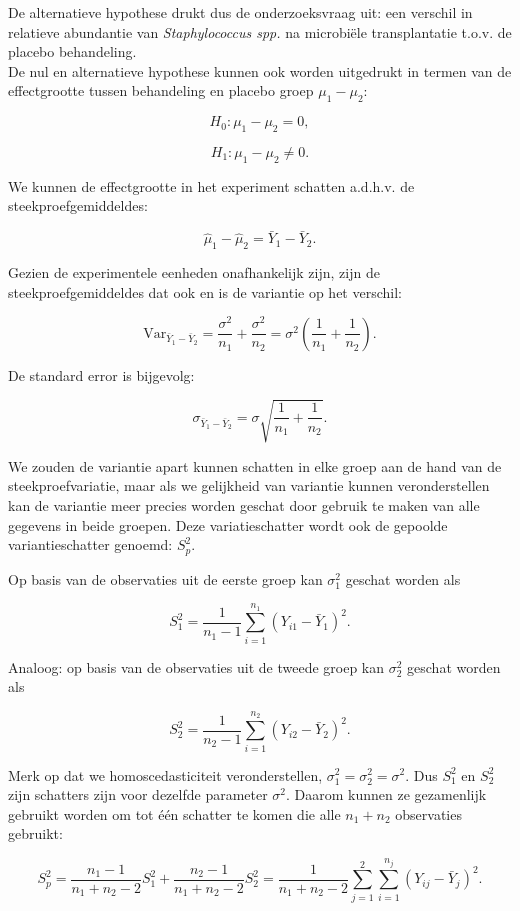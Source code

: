 \documentclass[
  12pt,dutch,coursenotes]{book}
\theoremstyle{definition}
\theoremstyle{definition}
\theoremstyle{definition}
\theoremstyle{definition}
\theoremstyle{remark}
\begin{document}
De alternatieve hypothese drukt dus de onderzoeksvraag uit: een verschil in relatieve abundantie van \emph{Staphylococcus spp.} na microbiële transplantatie t.o.v. de placebo behandeling.\\
De nul en alternatieve hypothese kunnen ook worden uitgedrukt in termen van de effectgrootte tussen behandeling en placebo groep \(\mu_1-\mu_2\):

\[H_0: \mu_1-\mu_2 = 0,\]

\[H_1: \mu_1-\mu_2 \neq 0.\]

We kunnen de effectgrootte in het experiment schatten a.d.h.v. de steekproefgemiddeldes:

\[\hat \mu_1-\hat \mu_2=\bar Y_1 -\bar Y_2.\]

Gezien de experimentele eenheden onafhankelijk zijn, zijn de steekproefgemiddeldes dat ook en is de variantie op het verschil:

\[\text{Var}_{\bar Y_1 -\bar Y_2}=\frac{\sigma^2}{n_1}+\frac{\sigma^2}{n_2}=\sigma^2 \left(\frac{1}{n_1}+\frac{1}{n_2}\right).\]

De standard error is bijgevolg:

\[\sigma_{\bar Y_1 -\bar Y_2}=\sigma\sqrt{\frac{1}{n_1}+\frac{1}{n_2}}.\]

We zouden de variantie apart kunnen schatten in elke groep aan de hand van de steekproefvariatie, maar als we gelijkheid van variantie kunnen veronderstellen kan de variantie meer precies worden geschat door gebruik te maken van alle gegevens in beide groepen.
Deze variatieschatter wordt ook de gepoolde variantieschatter genoemd: \(S^2_p\).

Op basis van de observaties uit de eerste groep kan \(\sigma^2_1\) geschat worden als

\[S_1^2 = \frac{1}{n_1-1}\sum_{i=1}^{n_1} (Y_{i1}-\bar{Y}_1)^2.\]

Analoog: op basis van de observaties uit de tweede groep kan \(\sigma^2_2\) geschat worden als

\[S_2^2 = \frac{1}{n_2-1}\sum_{i=1}^{n_2} (Y_{i2}-\bar{Y}_2)^2.\]

Merk op dat we homoscedasticiteit veronderstellen, \(\sigma_1^2=\sigma_2^2=\sigma^2\). Dus \(S_1^2\) en \(S_2^2\) zijn schatters zijn voor dezelfde parameter \(\sigma^2\). Daarom kunnen ze gezamenlijk gebruikt worden om tot één schatter te komen die alle \(n_1+n_2\) observaties gebruikt:

\[  S_p^2 = \frac{n_1-1}{n_1+n_2-2} S_1^2 + \frac{n_2-1}{n_1+n_2-2} S_2^2 = \frac{1}{n_1+n_2-2}\sum_{j=1}^2\sum_{i=1}^{n_j} (Y_{ij} - \bar{Y}_j)^2.\]
\end{document}
